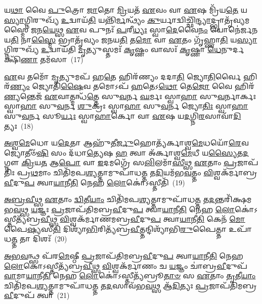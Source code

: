 𑌯\-\ul{𑌥𑌾} 𑌵𑍈 \ul{𑌪𑍁}\-𑌤𑍍𑌰𑍋 \ul{𑌜𑌾}\-𑌤𑍋 \ul{𑌮𑍍𑌰𑌿}\-𑌯𑌤᳴ \ul{𑌏}\-𑌵𑌂 𑌵𑌾 \ul{𑌏}\-𑌷 𑌮𑍍𑌰𑌿᳴𑌯\-\ul{𑌤𑍇} 𑌯\-\ul{𑌸𑍍𑌯𑌾}\-𑌗𑍍𑌨𑌿𑌰𑍁𑌖𑍍𑌯᳴ \ul{𑌉}\-𑌦𑍍𑌵𑌾𑌯᳴\-\ul{𑌤𑌿} 𑌯𑌨𑍍𑌨𑌿᳴\-\ul{𑌰𑍍𑌮}\-𑌨𑍍𑌥𑍍𑌯𑌂᳴ \ul{𑌕𑍁}\-𑌰𑍍𑌯𑌾𑌦𑍍𑌵𑌿𑌚𑍍𑌛𑌿᳴\-\ul{𑌨𑍍𑌦𑍍𑌯𑌾}\-𑌦𑍍𑌭𑍍𑌰𑌾𑌤𑍃᳴𑌵𑍍𑌯𑌮𑌸𑍍𑌮𑍈 𑌜𑌨\-\ul{𑌯𑍇}\-𑌥𑍍𑌸 \ul{𑌏}\-𑌵 𑌪𑍁𑌨𑌃᳴ \ul{𑌪}\-𑌰𑍀\-\ul{𑌧𑍍𑌯𑌃} 𑌸𑍍𑌵𑌾\-\ul{𑌦𑍇}\-𑌵𑍈\-\ul{𑌨𑌂} 𑌯𑍋𑌨𑍇॑𑌰𑍍𑌜𑌨𑌯\-\ul{𑌤𑌿} 𑌨𑌾\-\ul{𑌸𑍍𑌮𑍈} 𑌭𑍍𑌰𑌾𑌤𑍃᳴𑌵𑍍𑌯𑌂 𑌜𑌨𑌯\-\ul{𑌤𑌿} 𑌤\-\ul{𑌮𑍋} 𑌵𑌾 \ul{𑌏}\-𑌤𑌂 𑌗𑍃᳴𑌹𑍍𑌣𑌾\-\ul{𑌤𑌿} 𑌯\-\ul{𑌸𑍍𑌯𑌾}\-𑌗𑍍𑌨𑌿𑌰𑍁𑌖𑍍𑌯᳴ \ul{𑌉}\-𑌦𑍍𑌵𑌾𑌯᳴𑌤𑌿 \ul{𑌮𑍃}\-𑌤𑍍𑌯𑍁𑌸𑍍𑌤𑌮𑌃᳴ \ul{𑌕𑍃}\-𑌷𑍍𑌣𑌂 𑌵𑌾𑌸𑌃᳴ \ul{𑌕𑍃}\-𑌷𑍍𑌣𑌾 \ul{𑌧𑍇}\-𑌨𑍁𑌰𑍍𑌦𑌕𑍍𑌷𑌿᳴\-\ul{𑌣𑌾} 𑌤𑌮᳴𑌸𑌾~(17)

\-\ul{𑌏}\-𑌵 𑌤𑌮𑍋᳴ \ul{𑌮𑍃}\-𑌤𑍍𑌯𑍁𑌮𑌪᳴ 𑌹\-\ul{𑌤𑍇} 𑌹𑌿𑌰᳴𑌣𑍍𑌯𑌂 𑌦𑌦𑌾\-\ul{𑌤𑌿} 𑌜𑍍𑌯𑍋\-\ul{𑌤𑌿}\-𑌰𑍍𑌵𑍈 𑌹𑌿𑌰᳴\-\ul{𑌣𑍍𑌯𑌂} 𑌜𑍍𑌯𑍋𑌤𑌿᳴\-\ul{𑌷𑍈}\-𑌵 𑌤𑌮𑍋\-𑌽𑌪᳴ \ul{𑌹}\-𑌤𑍇\-𑌽\-\ul{𑌥𑍋} 𑌤𑍇\-\ul{𑌜𑍋} 𑌵𑍈 𑌹𑌿𑌰᳴\-\ul{𑌣𑍍𑌯}\-𑌨𑍍𑌤𑍇𑌜᳴ \ul{𑌏}\-𑌵𑌾𑌤𑍍𑌮𑌨𑍍𑌧᳴\-\ul{𑌤𑍍𑌤𑍇} 𑌸𑍁\-\ul{𑌵}\-𑌰𑍍𑌨 \ul{𑌘}\-𑌰𑍍𑌮𑌃 𑌸𑍍𑌵𑌾\-\ul{𑌹𑌾} 𑌸𑍁\-\ul{𑌵}\-𑌰𑍍𑌨𑌾𑌰𑍍𑌕𑌃 𑌸𑍍𑌵𑌾\-\ul{𑌹𑌾} 𑌸𑍁\-\ul{𑌵}\-𑌰𑍍𑌨 \ul{𑌶𑍁}\-𑌕𑍍𑌰𑌃 𑌸𑍍𑌵𑌾\-\ul{𑌹𑌾} 𑌸𑍁\-\ul{𑌵}\-𑌰𑍍𑌨 𑌜𑍍𑌯𑍋\-\ul{𑌤𑌿𑌃} 𑌸𑍍𑌵𑌾\-\ul{𑌹𑌾} 𑌸𑍁\-\ul{𑌵}\-𑌰𑍍𑌨 𑌸𑍂\-\ul{𑌰𑍍𑌯𑌃} 𑌸𑍍𑌵𑌾\-\ul{𑌹𑌾}\-𑌰𑍍𑌕𑍋 𑌵𑌾 \ul{𑌏}\-𑌷 𑌯\-\ul{𑌦}\-𑌗𑍍𑌨𑌿\-\ul{𑌰}\-𑌸𑌾𑌵𑌾᳴\-\ul{𑌦𑌿}\-𑌤𑍍𑌯𑌃~(18)

\-\ul{𑌅}\-\-\ul{𑌶𑍍𑌵}\-\-\ul{𑌮𑍇}\-𑌧𑍋 𑌯\-\ul{𑌦𑍇}\-𑌤𑌾 𑌆𑌹𑍁᳴𑌤𑍀\-\ul{𑌰𑍍𑌜𑍁}\-𑌹𑍋𑌤𑍍𑌯᳴𑌰𑍍𑌕𑌾𑌶𑍍𑌵\-\ul{𑌮𑍇}\-𑌧𑌯𑍋᳴\-\ul{𑌰𑍇}\-𑌵 𑌜𑍍𑌯𑍋𑌤𑍀𑍞᳴\-\ul{𑌷𑌿} 𑌸𑌂 𑌦᳴𑌧𑌾\-\ul{𑌤𑍍𑌯𑍇}\-𑌷 \ul{𑌹} 𑌤𑍍𑌵𑌾 𑌅᳴𑌰𑍍𑌕𑌾𑌶𑍍𑌵\-\ul{𑌮𑍇}\-𑌧𑍀 𑌯\-\ul{𑌸𑍍𑌯𑍈}\-𑌤\-\ul{𑌦}\-𑌗𑍍𑌨𑍗 \ul{𑌕𑍍𑌰𑌿}\-𑌯\-\ul{𑌤} 𑌆\-\ul{𑌪𑍋} 𑌵𑌾 \ul{𑌇}\-𑌦𑌮𑌗𑍍𑌰𑍇᳴ 𑌸\-\ul{𑌲𑌿}\-𑌲𑌮𑌾᳴\-\ul{𑌸𑍀}\-𑌥𑍍𑌸 \ul{𑌏}\-𑌤𑌾𑌂 \ul{𑌪𑍍𑌰}\-𑌜𑌾𑌪᳴𑌤𑌿𑌃 𑌪𑍍𑌰\-\ul{𑌥}\-𑌮𑌾𑌂 𑌚𑌿𑌤𑌿᳴𑌮𑌪\-\ul{𑌶𑍍𑌯}\-𑌤𑍍𑌤𑌾𑌮𑍁𑌪𑌾᳴𑌧\-\ul{𑌤𑍍𑌤} 𑌤\-\ul{𑌦𑌿}\-𑌯𑌮᳴𑌭\-\ul{𑌵}\-𑌤𑍍𑌤𑌂 \ul{𑌵𑌿}\-𑌶𑍍𑌵𑌕᳴𑌰𑍍𑌮𑌾𑌬𑍍𑌰\-\ul{𑌵𑍀}\-𑌦𑍁\-\ul{𑌪} 𑌤𑍍𑌵𑌾\-\ul{𑌯𑌾}\-𑌨𑍀\-\ul{𑌤𑌿} 𑌨𑍇𑌹 \ul{𑌲𑍋}\-𑌕𑍋॑\-𑌽𑌸𑍍𑌤𑍀𑌤𑌿᳴~(19)

\-\ul{𑌅}\-\-\ul{𑌬𑍍𑌰}\-\-\ul{𑌵𑍀}\-𑌥𑍍𑌸 \ul{𑌏}\-𑌤𑌾𑌂 \ul{𑌦𑍍𑌵𑌿}\-𑌤𑍀\-\ul{𑌯𑌾𑌂} 𑌚𑌿𑌤𑌿᳴𑌮𑌪\-\ul{𑌶𑍍𑌯}\-𑌤𑍍𑌤𑌾𑌮𑍁𑌪𑌾᳴𑌧\-\ul{𑌤𑍍𑌤} 𑌤\-\ul{𑌦}\-𑌨𑍍𑌤𑌰𑌿᳴𑌕𑍍𑌷𑌮𑌭\-\ul{𑌵}\-𑌥𑍍𑌸 \ul{𑌯}\-𑌜𑍍𑌞𑌃 \ul{𑌪𑍍𑌰}\-𑌜𑌾𑌪᳴𑌤𑌿𑌮𑌬𑍍𑌰\-\ul{𑌵𑍀}\-𑌦𑍁\-\ul{𑌪} 𑌤𑍍𑌵𑌾\-\ul{𑌯𑌾}\-𑌨𑍀\-\ul{𑌤𑌿} 𑌨𑍇𑌹 \ul{𑌲𑍋}\-𑌕𑍋॑\-𑌽𑌸𑍍𑌤𑍀𑌤𑍍𑌯᳴𑌬𑍍𑌰\-\ul{𑌵𑍀}\-𑌥𑍍𑌸 \ul{𑌵𑌿}\-𑌶𑍍𑌵𑌕᳴𑌰𑍍𑌮𑌾𑌣𑌮𑌬𑍍𑌰\-\ul{𑌵𑍀}\-𑌦𑍁\-\ul{𑌪} 𑌤𑍍𑌵𑌾\-\ul{𑌯𑌾}\-𑌨𑍀\-\ul{𑌤𑌿} 𑌕𑍇𑌨᳴ \ul{𑌮𑍋}\-𑌪𑍈\-\ul{𑌷𑍍𑌯}\-𑌸𑍀\-\ul{𑌤𑌿} 𑌦𑌿𑌶𑍍𑌯𑌾᳴\-\ul{𑌭𑌿}\-𑌰𑌿𑌤𑍍𑌯᳴𑌬𑍍𑌰\-\ul{𑌵𑍀}\-𑌤𑍍𑌤𑌨𑍍𑌦𑌿𑌶𑍍𑌯𑌾᳴𑌭𑌿\-\ul{𑌰𑍁}\-𑌪𑍈𑌤𑍍𑌤𑌾 𑌉𑌪𑌾᳴𑌧\-\ul{𑌤𑍍𑌤} 𑌤𑌾 𑌦𑌿𑌶𑌃᳴~(20)

\-\ul{𑌅}\-\-\ul{𑌭}\-\-\ul{𑌵}\-𑌨𑍍𑌥𑍍𑌸 𑌪᳴𑌰\-\ul{𑌮𑍇}\-𑌷𑍍𑌠𑍀 \ul{𑌪𑍍𑌰}\-𑌜𑌾𑌪᳴𑌤𑌿𑌮𑌬𑍍𑌰\-\ul{𑌵𑍀}\-𑌦𑍁\-\ul{𑌪} 𑌤𑍍𑌵𑌾\-\ul{𑌯𑌾}\-𑌨𑍀\-\ul{𑌤𑌿} 𑌨𑍇𑌹 \ul{𑌲𑍋}\-𑌕𑍋॑\-𑌽𑌸𑍍𑌤𑍀𑌤𑍍𑌯᳴𑌬𑍍𑌰\-\ul{𑌵𑍀}\-𑌥𑍍𑌸 \ul{𑌵𑌿}\-𑌶𑍍𑌵𑌕᳴𑌰𑍍𑌮𑌾𑌣𑌂 𑌚 \ul{𑌯}\-𑌜𑍍𑌞𑌂 𑌚𑌾॑𑌬𑍍𑌰\-\ul{𑌵𑍀}\-𑌦𑍁𑌪᳴ \ul{𑌵𑌾}\-𑌮𑌾\-\ul{𑌯𑌾}\-𑌨𑍀\-\ul{𑌤𑌿} 𑌨𑍇𑌹 \ul{𑌲𑍋}\-𑌕𑍋॑\-𑌽𑌸𑍍𑌤𑍀𑌤𑍍𑌯᳴𑌬𑍍𑌰𑍂\-\ul{𑌤𑌾}\-\-\ul{𑍞} 𑌸 \ul{𑌏}\-𑌤𑌾𑌂 \ul{𑌤𑍃}\-𑌤𑍀\-\ul{𑌯𑌾𑌂} 𑌚𑌿𑌤𑌿᳴𑌮𑌪\-\ul{𑌶𑍍𑌯}\-𑌤𑍍𑌤𑌾𑌮𑍁𑌪𑌾᳴𑌧\-\ul{𑌤𑍍𑌤} 𑌤\-\ul{𑌦}\-𑌸𑌾𑌵᳴𑌭\-\ul{𑌵}\-𑌥𑍍𑌸 𑌆᳴\-\ul{𑌦𑌿}\-𑌤𑍍𑌯𑌃 \ul{𑌪𑍍𑌰}\-𑌜𑌾𑌪᳴𑌤𑌿𑌮𑌬𑍍𑌰\-\ul{𑌵𑍀}\-𑌦𑍁𑌪᳴ 𑌤𑍍𑌵𑌾~(21)

